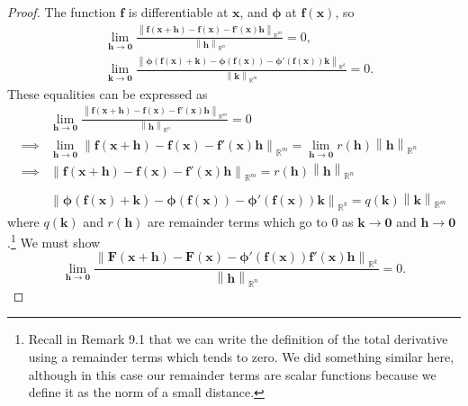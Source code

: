 \documentclass{article}
\newcommand{\R}{\mathbb{R}}
\newcommand{\x}{\mathbf{x}}
\newcommand{\f}{\mathbf{f}}
\newcommand{\h}{\mathbf{h}}
\newcommand{\ze}{\mathbf{0}}
\newcommand{\norm}[1]{\left\lVert#1\right\rVert}
\theoremstyle{definition}
\begin{document}
	\begin{proof}
		The function $ \f $ is differentiable at $ \x $, and $ \boldsymbol{\phi} $ at $ \f(\x) $, so 
		\begin{align*}
			&\lim\limits_{\mathbf h\to \ze}\frac{\norm{\f(\x+\mathbf h) - \f(\x)-\f'(\x)\mathbf{h}}_{\R^m}}{\norm{\mathbf h}_{\R^n}} = 0,\\
			&\lim\limits_{\mathbf k\to \ze}\frac{\norm{\boldsymbol{\phi}(\f(\x) + \mathbf k) - \boldsymbol{\phi}(\f(\x))-\boldsymbol{\phi}'(\f(\x))\mathbf{k}}_{\R^k}}{\norm{\mathbf k}_{\R^m}} = 0.
		\end{align*}
		These equalities can be expressed as 
		\begin{align}
			&\lim\limits_{\mathbf h\to \ze}\frac{\norm{\f(\x+\mathbf h) - \f(\x)-\f'(\x)\mathbf{h}}_{\R^m}}{\norm{\mathbf h}_{\R^n}} = 0 \nonumber\\ 
			\implies& \lim\limits_{\mathbf h\to \ze}\norm{\f(\x+\mathbf h) - \f(\x)-\f'(\x)\mathbf{h}}_{\R^m}= \lim\limits_{\mathbf h\to \ze}r(\h)\norm{\mathbf h}_{\R^n}\nonumber\\
			\implies&  \norm{\f(\x+\mathbf h) - \f(\x)-\f'(\x)\mathbf{h}}_{\R^m}= r(\h)\norm{\mathbf h}_{\R^n}\\\nonumber\\
			&\norm{\boldsymbol{\phi}(\f(\x) + \mathbf k) - \boldsymbol{\phi}(\f(\x))-\boldsymbol{\phi}'(\f(\x))\mathbf{k}}_{\R^k} = q(\mathbf k)\norm{\mathbf k}_{\R^m}
		\end{align}
		where $ q(\mathbf k) $ and $ r(\h) $ are remainder terms which go to $ 0 $ as $ \mathbf k\to\ze  $ and $ \h\to \ze $.\footnote{Recall in Remark 9.1 that we can write the definition of the total derivative using a remainder terms which tends to zero. We did something similar here, although in this case our remainder terms are scalar functions because we define it as the norm of a small distance.} We must show $$\lim_{\mathbf h\to \ze}	\frac{\norm{\mathbf F(\x + \h) -\mathbf F(\x) - \boldsymbol{\phi}'(\f(\x))\f'(\x)\h}_{\R^k}}{\norm{\h}_{\R^n}} = 0.$$
		

\end{proof}
\end{document}
